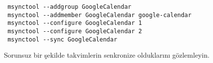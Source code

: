 \documentclass[a4paper,10pt]{article}
\begin{document}
\begin{enumerate}
\begin{itemize}
\begin{verbatim}
 msynctool --addgroup GoogleCalendar
 msynctool --addmember GoogleCalendar google-calendar
 msynctool --configure GoogleCalendar 1
 msynctool --configure GoogleCalendar 2
 msynctool --sync GoogleCalendar	
\end{verbatim}

\end{itemize}

Sorunsuz bir şekilde takvimlerin senkronize olduklarını gözlemleyin.	
\end{enumerate}
\end{document}

